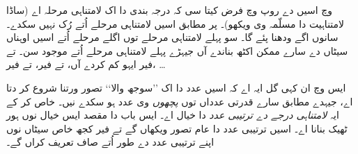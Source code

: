 \documentclass[../../../include/open-logic-section]{subfiles}
\begin{document}


 وچ اسیں \stagesinf{} دے روپ وچ فرض کیتا سی کہ
درجہ بندی دا اک لامتناہی مرحلہ اے (ساڈا لامتناہیت دا مسلّمہ وی ویکھو)۔
پر \stagessucc{} مطابق اسیں لامتناہی مرحلے اُتے رُک نہیں سکدے۔
سانوں اگے ودھنا پئے گا۔ سو پہلے لامتناہی مرحلے توں اگلے مرحلے اُتے
اسیں اوہناں سیٹاں دے سارے ممکن اکٹھ بناندے آں جیہڑے پہلے لامتناہی
مرحلے اُتے موجود سن۔ تے فیر ایہو کم کردے آں، تے فیر، تے فیر، \dots

ایس وچ ان کہی گل ایہ اے کہ اسیں عدد دا اک ’’سوجھ والا‘‘ تصور ورتنا
شروع کر دتا اے، جیہدے مطابق سارے قدرتی عدداں توں \emph{پچھوں} وی عدد
ہو سکدے نیں۔ خاص کر کے ایہ \emph{لامتناہی درجے دے ترتیبی عدد} دا خیال
اے۔ ایس باب دا مقصد ایس خیال نوں ہور ٹھیک بنانا اے۔ اسیں ترتیبی عدد
دا عام تصور ویکھاں گے تے فیر کجھ خاص سیٹاں نوں اپنے ترتیبی عدد دے طور
اُتے صاف تعریف کراں گے۔
\end{document}
